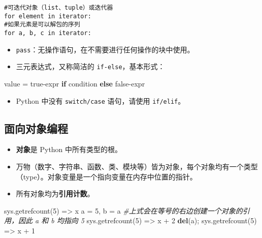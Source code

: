 \documentclass[]{article}
\newenvironment{Shaded}{}{}
\newcommand{\KeywordTok}[1]{\textcolor[rgb]{0.00,0.44,0.13}{\textbf{#1}}}
\newcommand{\DecValTok}[1]{\textcolor[rgb]{0.25,0.63,0.44}{#1}}
\newcommand{\CommentTok}[1]{\textcolor[rgb]{0.38,0.63,0.69}{\textit{#1}}}
\newcommand{\ControlFlowTok}[1]{\textcolor[rgb]{0.00,0.44,0.13}{\textbf{#1}}}
\newcommand{\OperatorTok}[1]{\textcolor[rgb]{0.40,0.40,0.40}{#1}}
\newcommand{\NormalTok}[1]{#1}
\begin{document}
\begin{verbatim}
#可迭代对象（list、tuple）或迭代器
for element in iterator:
#如果元素是可以解包的序列
for a, b, c in iterator:
\end{verbatim}

\begin{itemize}
\item
  \texttt{pass}：无操作语句，在不需要进行任何操作的块中使用。
\item
  三元表达式，又称简洁的 \texttt{if-else}，基本形式：
\end{itemize}

\begin{Shaded}
\begin{Highlighting}[]
\NormalTok{value }\OperatorTok{=}\NormalTok{ true}\OperatorTok{-}\NormalTok{expr }\ControlFlowTok{if}\NormalTok{ condition }\ControlFlowTok{else}\NormalTok{ false}\OperatorTok{-}\NormalTok{expr}
\end{Highlighting}
\end{Shaded}

\begin{itemize}
\item
  Python 中没有 \texttt{switch/case} 语句，请使用 \texttt{if/elif}。
\end{itemize}

\hypertarget{header-n332}{\subsection{面向对象编程}\label{header-n332}}

\begin{itemize}
\item
  \textbf{对象}是 Python 中所有类型的根。
\item
  万物（数字、字符串、函数、类、模块等）皆为对象，每个对象均有一个类型（type）。对象变量是一个指向变量在内存中位置的指针。
\item
  所有对象均为\textbf{引用计数}。
\end{itemize}

\begin{Shaded}
\begin{Highlighting}[]
\NormalTok{sys.getrefcount(}\DecValTok{5}\NormalTok{) }\OperatorTok{=>}\NormalTok{ x}
\NormalTok{a }\OperatorTok{=} \DecValTok{5}\NormalTok{, b }\OperatorTok{=}\NormalTok{ a}
\CommentTok{#上式会在等号的右边创建一个对象的引用，因此 a 和 b 均指向 5}
\NormalTok{sys.getrefcount(}\DecValTok{5}\NormalTok{)}
\OperatorTok{=>}\NormalTok{ x }\OperatorTok{+} \DecValTok{2}
\KeywordTok{del}\NormalTok{(a)}\OperatorTok{;}\NormalTok{ sys.getrefcount(}\DecValTok{5}\NormalTok{) }\OperatorTok{=>}\NormalTok{ x }\OperatorTok{+} \DecValTok{1}
\end{Highlighting}
\end{Shaded}
\end{document}
